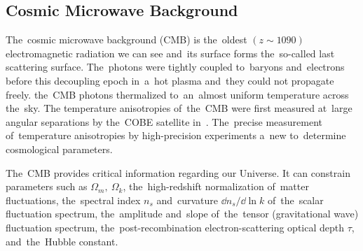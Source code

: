 \subsection{Cosmic Microwave Background}
The~cosmic microwave background (CMB) is the~oldest $(z\sim1090)$ electromagnetic radiation we can see and~its surface forms the~so-called last scattering surface. The~photons were tightly coupled to~baryons and~electrons before this decoupling epoch in~a~hot plasma and~they could not propagate freely. \DIFdelbegin {}\DIFdelend \DIFaddbegin {}\DIFaddend the~CMB photons \DIFaddbegin {}\DIFaddend thermalized to~an~almost uniform temperature across the~\DIFaddbegin {}\DIFaddend sky. The \DIFdelbegin \DIFdel{~}\DIFdelend \DIFaddbegin {}\DIFaddend temperature anisotropies of~the~CMB were first measured at~large angular separations by the~COBE satellite in~\textcite{1992ApJ...396L...1S}. The~precise measurement of~temperature anisotropies by high-precision experiments \parencite[e.g.][]{2003ApJS..148..175S} \DIFdelbegin {}\DIFdelend \DIFaddbegin {}\DIFaddend a~new \DIFdelbegin {}\DIFdelend \DIFaddbegin {}\DIFaddend to~determine cosmological parameters\DIFdelbegin {}\DIFdelend .

The~CMB provides critical information regarding our Universe. It can constrain parameters such as $\Omega_m,\ \Omega_k$, the~high-redshift normalization of~matter fluctuations, the~spectral index $n_s$ and~curvature $\dd n_s/\dd \ln k$ of~the~scalar fluctuation spectrum, the~amplitude and~slope of~the~tensor (gravitational wave) fluctuation spectrum, the~post-recombination electron-scattering optical depth $\tau$, and~the~Hubble constant.

